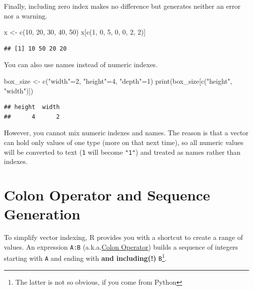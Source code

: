 \documentclass[
]{book}
\newenvironment{Shaded}{\begin{snugshade}}{\end{snugshade}}
\newcommand{\DecValTok}[1]{\textcolor[rgb]{0.00,0.00,0.81}{#1}}
\newcommand{\FunctionTok}[1]{\textcolor[rgb]{0.00,0.00,0.00}{#1}}
\newcommand{\NormalTok}[1]{#1}
\newcommand{\OtherTok}[1]{\textcolor[rgb]{0.56,0.35,0.01}{#1}}
\newcommand{\StringTok}[1]{\textcolor[rgb]{0.31,0.60,0.02}{#1}}
\begin{document}
Finally, including zero index makes no difference but generates neither an error nor a warning.

\begin{Shaded}
\begin{Highlighting}[]
\NormalTok{x }\OtherTok{\textless{}{-}} \FunctionTok{c}\NormalTok{(}\DecValTok{10}\NormalTok{, }\DecValTok{20}\NormalTok{, }\DecValTok{30}\NormalTok{, }\DecValTok{40}\NormalTok{, }\DecValTok{50}\NormalTok{)}
\NormalTok{x[}\FunctionTok{c}\NormalTok{(}\DecValTok{1}\NormalTok{, }\DecValTok{0}\NormalTok{, }\DecValTok{5}\NormalTok{, }\DecValTok{0}\NormalTok{, }\DecValTok{0}\NormalTok{, }\DecValTok{2}\NormalTok{, }\DecValTok{2}\NormalTok{)]}
\end{Highlighting}
\end{Shaded}

\begin{verbatim}
## [1] 10 50 20 20
\end{verbatim}

You can also use names instead of numeric indexes.

\begin{Shaded}
\begin{Highlighting}[]
\NormalTok{box\_size }\OtherTok{\textless{}{-}} \FunctionTok{c}\NormalTok{(}\StringTok{"width"}\OtherTok{=}\DecValTok{2}\NormalTok{, }\StringTok{"height"}\OtherTok{=}\DecValTok{4}\NormalTok{, }\StringTok{"depth"}\OtherTok{=}\DecValTok{1}\NormalTok{) }
\FunctionTok{print}\NormalTok{(box\_size[}\FunctionTok{c}\NormalTok{(}\StringTok{"height"}\NormalTok{, }\StringTok{"width"}\NormalTok{)])}
\end{Highlighting}
\end{Shaded}

\begin{verbatim}
## height  width 
##      4      2
\end{verbatim}

However, you cannot mix numeric indexes and names. The reason is that a vector can hold only values of one type (more on that next time), so all numeric values will be converted to text (\texttt{1} will become \texttt{"1"}) and treated as names rather than indexes.

\hypertarget{colon-sequence}{%
\section{Colon Operator and Sequence Generation}\label{colon-sequence}}

To simplify vector indexing, R provides you with a shortcut to create a range of values. An expression \texttt{A:B} (a.k.a.\href{https://stat.ethz.ch/R-manual/R-devel/library/base/html/Colon.html}{Colon Operator}) builds a sequence of integers starting with \texttt{A} and ending with \textbf{and including(!)} \texttt{B}\footnote{The latter is not so obvious, if you come from Python}.
\end{document}
